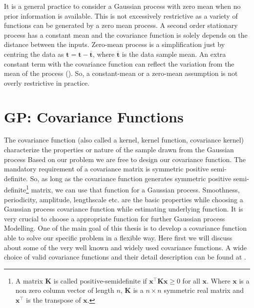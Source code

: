 It is a general practice to consider a Gaussian process with zero mean when no prior information is available. This is not excessively restrictive as a variety of functions can be generated by a zero mean process. A second order stationary process has a constant mean and the covariance function is solely depends on the distance between the inputs. Zero-mean process is a simplification just by centring the data as $\textbf{t} = \textbf{t} - \overline{\textbf{t}}$, where $\overline{\textbf{t}}$ is the data sample mean. An extra constant term with the covariance function can reflect the variation from the mean of the process (\cite{MacKay:2003}). So, a constant-mean or a zero-mean assumption is not overly restrictive in practice.

\section{GP: Covariance Functions}
The covariance function (also called a kernel, kernel function, covariance kernel) characterize the properties or nature of the sample drawn from the Gaussian process 
Based on our problem we are free to design our covariance function. The mandatory requirement of a covariance matrix is symmetric positive semi-definite. So, as long as the covariance function generates symmetric positive semi-definite\footnote{A matrix $\textbf{K}$ is called positive-semidefinite if $\textbf{x}^{\top}\textbf{K}\textbf{x} \geq 0$ for all $\textbf{x}$. Where $\textbf{x}$ is a non zero column vector of length $n$, $\textbf{K}$ is a $n\times n$ symmetric real matrix and $\textbf{x}^{\top}$ is the transpose of $\textbf{x}$.} matrix, we can use that function for a Gaussian process. Smoothness, periodicity, amplitude, lengthscale etc. are the basic properties while choosing a Gaussian process covariance function while estimating underlying function. It is very crucial to choose a appropriate function for further Gaussian process Modelling. One of the main goal of this thesis is to develop a covariance function able to solve our specific problem in a flexible way. Here first we will discuss about some of the very well known and widely used covariance functions. A wide choice of valid covariance functions and their detail description can be found at \cite{Rasmussen_and_Williams:2006}.


